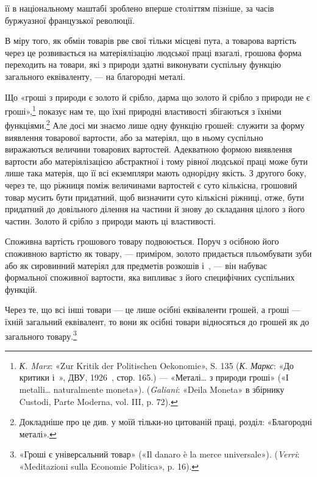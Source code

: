 \parcont{}  %
її в національному маштабі зроблено вперше століттям пізніше,
за часів буржуазної французької революції.

В міру того, як обмін товарів рве свої тільки місцеві пута,
а товарова вартість через це розвивається на матеріялізацію
людської праці взагалі, грошова форма переходить на товари,
які з природи здатні виконувати суспільну функцію загального
еквіваленту, — на благородні металі.

Що «гроші з природи є золото й срібло, дарма що золото й
срібло з природи не є гроші»,\footnote{
\emph{К. Marx}: «Zur Kritik der Politischen Oekonomie», S. 135 (\emph{К. Маркс}:
«До критики і~», ДВУ, 1926~, стор. 165.) — «Металі\dots{} з природи
гроші» («І metalli\dots{} naturalmente moneta»). (\emph{Galiani}: «Deila Moneta»
в збірнику Custodi, Parte Moderna, vol. III, p. 72).
} показує нам те, що їхні природні
властивості збігаються з їхніми функціями.\footnote{
Докладніше про це див. у моїй тільки-но цитованій праці, розділ:
«Благородні металі».
} Але досі
ми знаємо лише одну функцію грошей: служити за форму виявлення
товарової вартости, або за матеріял, що в ньому суспільно
виражаються величини товарових вартостей. Адекватною формою
виявлення вартости або матеріялізацією абстрактної і тому рівної
людської праці може бути лише така матерія, що її всі екземпляри
мають однорідну якість. З другого боку, через те, що ріжниця
поміж величинами вартостей є суто кількісна, грошовий товар
мусить бути придатний, щоб визначити суто кількісні ріжниці,
отже, бути придатний до довільного ділення на частини й знову
до складання цілого з його частин. Золото й срібло з природи
мають ці властивості.

Споживна вартість грошового товару подвоюється. Поруч з
осібною його споживною вартістю як товару, — приміром, золото
придається пльомбувати зуби або як сировинний матеріял
для предметів розкошів і~, — він набуває формальної споживної
вартости, яка випливає з його специфічних суспільних
функцій.

Через те, що всі інші товари — це лише осібні еквіваленти
грошей, а гроші — їхній загальний еквівалент, то вони як осібні
товари відносяться до грошей як до загального товару.\footnote{
«Гроші є універсальний товар» («Il danaro è la merce universale»).
(\emph{Verri}: «Meditazioni sulla Economie Politica», p. 16).
}

